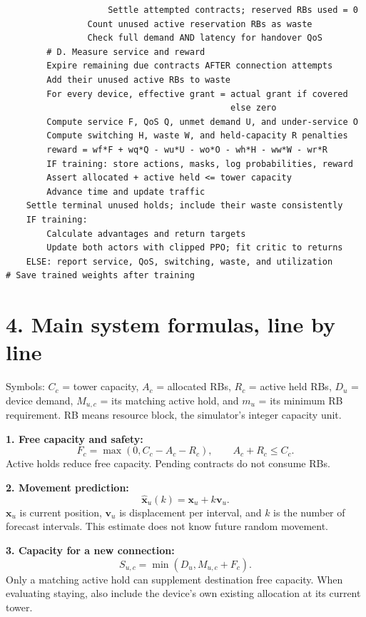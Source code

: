 \documentclass[10pt,a4paper]{article}
\begin{document}
\begin{lstlisting}
                    Settle attempted contracts; reserved RBs used = 0
                Count unused active reservation RBs as waste
                Check full demand AND latency for handover QoS
        # D. Measure service and reward
        Expire remaining due contracts AFTER connection attempts
        Add their unused active RBs to waste
        For every device, effective grant = actual grant if covered
                                            else zero
        Compute service F, QoS Q, unmet demand U, and under-service O
        Compute switching H, waste W, and held-capacity R penalties
        reward = wf*F + wq*Q - wu*U - wo*O - wh*H - ww*W - wr*R
        IF training: store actions, masks, log probabilities, reward
        Assert allocated + active held <= tower capacity
        Advance time and update traffic
    Settle terminal unused holds; include their waste consistently
    IF training:
        Calculate advantages and return targets
        Update both actors with clipped PPO; fit critic to returns
    ELSE: report service, QoS, switching, waste, and utilization
# Save trained weights after training
\end{lstlisting}

\newpage
\section*{4. Main system formulas, line by line}
Symbols: $C_c$ = tower capacity, $A_c$ = allocated RBs, $R_c$ = active held RBs, $D_u$ = device demand, $M_{u,c}$ = its matching active hold, and $m_u$ = its minimum RB requirement. RB means resource block, the simulator's integer capacity unit.

\textbf{1. Free capacity and safety:}
\begin{equation}
F_c=\max(0,C_c-A_c-R_c),\qquad A_c+R_c\le C_c.
\end{equation}
Active holds reduce free capacity. Pending contracts do not consume RBs.

\textbf{2. Movement prediction:}
\begin{equation}
\widehat{\mathbf x}_u(k)=\mathbf x_u+k\mathbf v_u.
\end{equation}
$\mathbf x_u$ is current position, $\mathbf v_u$ is displacement per interval, and $k$ is the number of forecast intervals. This estimate does not know future random movement.

\textbf{3. Capacity for a new connection:}
\begin{equation}
S_{u,c}=\min(D_u,M_{u,c}+F_c).
\end{equation}
Only a matching active hold can supplement destination free capacity. When evaluating staying, also include the device's own existing allocation at its current tower.
\end{document}
